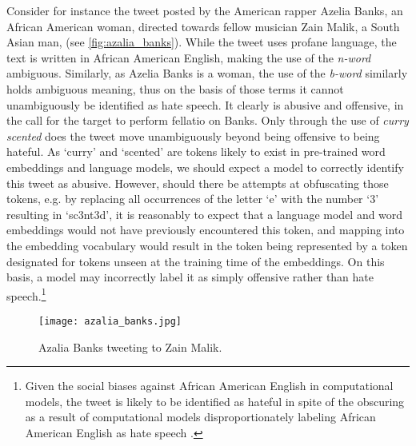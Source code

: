 Consider for instance the tweet posted by the American rapper Azelia Banks, an African American woman, directed towards fellow musician Zain Malik, a South Asian man, (see \autoref{fig:azalia_banks}). While the tweet uses profane language, the text is written in African American English, making the use of the \textit{n-word} ambiguous. Similarly, as Azelia Banks is a woman, the use of the \textit{b-word} similarly holds ambiguous meaning, thus on the basis of those terms it cannot unambiguously be identified as hate speech. It clearly is abusive and offensive, in the call for the target to perform fellatio on Banks. Only through the use of \textit{curry scented} does the tweet move unambiguously beyond being offensive to being hateful. As `curry' and `scented' are tokens likely to exist in pre-trained word embeddings and language models, we should expect a model to correctly identify this tweet as abusive. However, should there be attempts at obfuscating those tokens, e.g. by replacing all occurrences of the letter `e' with the number `$3$' resulting in `sc3nt3d', it is reasonably to expect that a language model and word embeddings would not have previously encountered this token, and mapping into the embedding vocabulary would result in the token being represented by a token designated for tokens unseen at the training time of the embeddings. On this basis, a model may incorrectly label it as simply offensive rather than hate speech.\footnote{Given the social biases against African American English in computational models, the tweet is likely to be identified as hateful in spite of the obscuring as a result of computational models disproportionately labeling African American English as hate speech \citep{Davidson:2019}.}

\begin{figure}[h]
  \centering
  \texttt{[image: azalia\_banks.jpg]}
  \caption{Azalia Banks tweeting to Zain Malik.}
  \label{fig:azalia_banks}
\end{figure}

